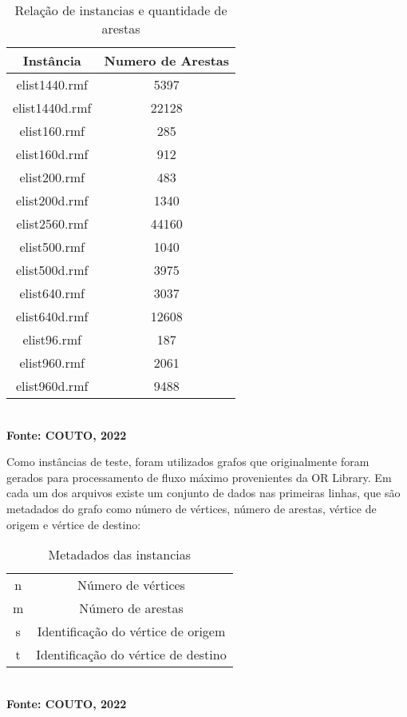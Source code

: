 \begin{table}[htb]
	\centering
	\caption{\hspace{0.1cm} Relação de instancias e quantidade de arestas}
	\vspace{-0.3cm} %
	\label{tab:tabela1}
	\begin{tabular}{|c|c|}
		\hline
		\textbf{Instância} & \textbf{Numero de Arestas} \\
		\hline
             elist1440.rmf & 5397 \\ 
             elist1440d.rmf & 22128 \\
             elist160.rmf & 285 \\
             elist160d.rmf & 912 \\
             elist200.rmf & 483 \\
             elist200d.rmf & 1340 \\
             elist2560.rmf & 44160 \\
             elist500.rmf & 1040 \\
             elist500d.rmf & 3975 \\
             elist640.rmf & 3037 \\
             elist640d.rmf & 12608 \\
             elist96.rmf & 187 \\
             elist960.rmf & 2061 \\
             elist960d.rmf & 9488 \\
    \hline
\end{tabular}
	\vspace{.1cm}  %
	\small
	{\footnotesize\\ \textbf{Fonte: COUTO, 2022}}
\end{table}


Como instâncias de teste, foram utilizados grafos que originalmente foram gerados para processamento de fluxo máximo provenientes da OR Library. Em cada um dos arquivos existe um conjunto de dados nas primeiras linhas, que são metadados do grafo como número de vértices, número de arestas, vértice de origem e vértice de destino:
\begin{table}[htb]
	\centering
	\caption{\hspace{0.1cm} Metadados das instancias}
	\vspace{-0.3cm} %
	\label{tab:tabela1}
	\begin{tabular}{|c|c|}
		\hline
             n & Número de vértices \\ 
             m & Número de arestas \\
             s & Identificação do vértice de origem \\
             t & Identificação do vértice de destino \\
    \hline
\end{tabular}
	\vspace{.1cm}  %
	\small
	{\footnotesize\\ \textbf{Fonte: COUTO, 2022}}
\end{table}

